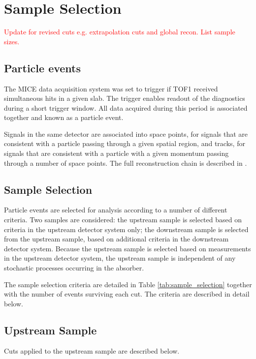 \section{Sample Selection}
\label{Sect:Cuts-1}

\textcolor{red}{Update for revised cuts e.g. extrapolation cuts and global recon. List sample sizes.}

\subsection{Particle events}
The MICE data acquisition system was set to trigger if TOF1 received 
simultaneous hits in a given slab. The trigger enables readout of the 
diagnostics during a short trigger window. All data acquired during this period 
is associated together and known as a particle event. 

Signals in the same detector are associated into space points, for signals that 
are consistent with a particle passing through a given spatial region, and 
tracks, for signals that are consistent with a particle with a given momentum 
passing through a number of space points. The full reconstruction chain is
described in \cite{maus_paper}.

\subsection{Sample Selection}
Particle events are selected for analysis according to a number of different
criteria. Two samples are considered: the upstream sample is selected based on 
criteria in the upstream detector system only; the downstream sample is 
selected from the upstream sample, based on additional criteria in the 
downstream detector system. Because the upstream sample is selected based on
measurements in the upstream detector system, the upstream sample is 
independent of any stochastic processes occurring in the absorber.

The sample selection criteria are detailed in Table \ref{tab:sample_selection}
together with the number of events surviving each cut. The criteria are
described in detail below.

\subsection{Upstream Sample}
Cuts applied to the upstream sample are described below.

